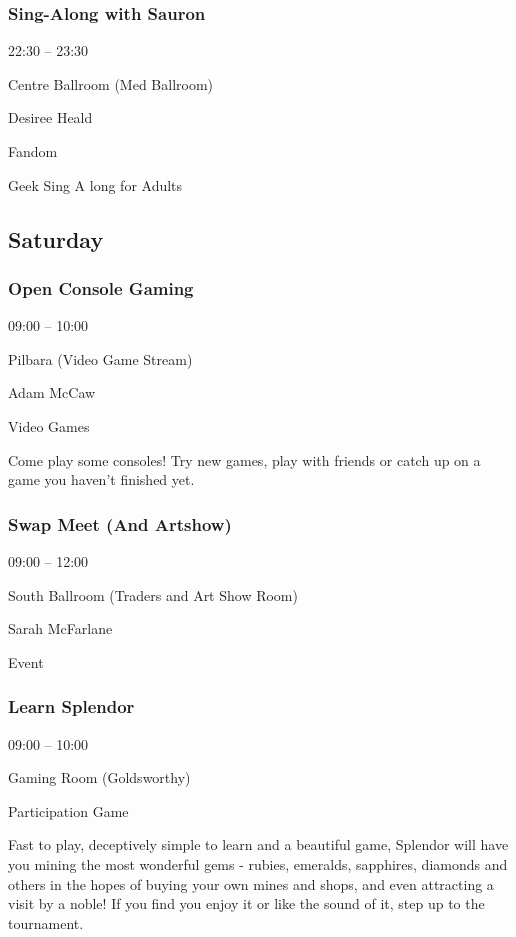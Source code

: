 \documentclass{scrreprt}
\begin{document}
\begin{multicols}{2}
\subsubsection*{Sing-Along with Sauron}\begin{description}
\setlength{\itemsep}{0pt}
\setlength{\parsep}{0pt}
\setlength{\parskip}{0pt}
\item[Time:]{22:30 -- 23:30}
\item[Venue:]{Centre Ballroom (Med Ballroom)}
\item[People:]{Desiree Heald}
\item[Tags:]{Fandom}\end{description}
Geek Sing A long for Adults
\subsection*{Saturday}\subsubsection*{Open Console Gaming}\begin{description}
\setlength{\itemsep}{0pt}
\setlength{\parsep}{0pt}
\setlength{\parskip}{0pt}
\item[Time:]{09:00 -- 10:00}
\item[Venue:]{Pilbara (Video Game Stream)}
\item[People:]{Adam McCaw}
\item[Tags:]{Video Games}\end{description}
Come play some consoles! Try new games, play with friends or catch up on a game you haven't finished yet.
\subsubsection*{Swap Meet (And Artshow)}\begin{description}
\setlength{\itemsep}{0pt}
\setlength{\parsep}{0pt}
\setlength{\parskip}{0pt}
\item[Time:]{09:00 -- 12:00}
\item[Venue:]{South Ballroom (Traders and Art Show Room)}
\item[People:]{Sarah McFarlane}
\item[Tags:]{Event}\end{description}

\subsubsection*{Learn Splendor}\begin{description}
\setlength{\itemsep}{0pt}
\setlength{\parsep}{0pt}
\setlength{\parskip}{0pt}
\item[Time:]{09:00 -- 10:00}
\item[Venue:]{Gaming Room (Goldsworthy)}
\item[Tags:]{Participation Game}\end{description}
Fast to play, deceptively simple to learn and a beautiful game, Splendor will have you mining the most wonderful gems - rubies, emeralds, sapphires, diamonds and others in the hopes of buying your own mines and shops, and even attracting a visit by a noble! If you find you enjoy it or like the sound of it, step up to the tournament.

\end{multicols}
\end{document}
